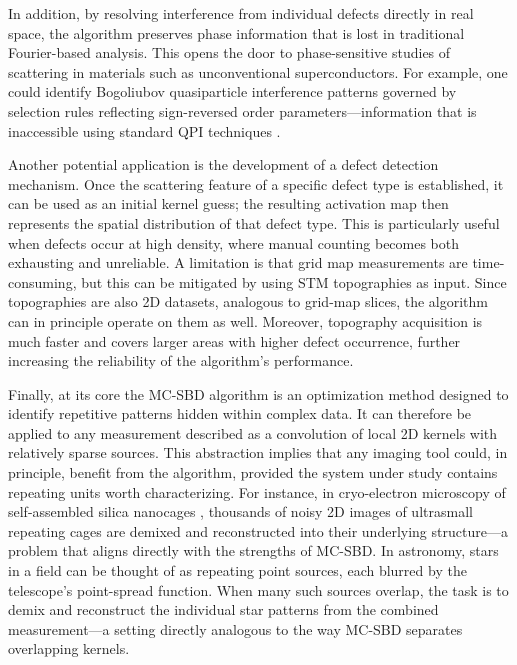 In addition, by resolving interference from individual defects directly in real space, the algorithm preserves phase information that is lost in traditional Fourier-based analysis. This opens the door to phase-sensitive studies of scattering in materials such as unconventional superconductors. For example, one could identify Bogoliubov quasiparticle interference patterns governed by selection rules reflecting sign-reversed order parameters—information that is inaccessible using standard QPI techniques \cite{chiSignInversionSuperconducting2014}.

Another potential application is the development of a defect detection mechanism. Once the scattering feature of a specific defect type is established, it can be used as an initial kernel guess; the resulting activation map then represents the spatial distribution of that defect type. This is particularly useful when defects occur at high density, where manual counting becomes both exhausting and unreliable. A limitation is that grid map measurements are time-consuming, but this can be mitigated by using STM topographies as input. Since topographies are also 2D datasets, analogous to grid-map slices, the algorithm can in principle operate on them as well. Moreover, topography acquisition is much faster and covers larger areas with higher defect occurrence, further increasing the reliability of the algorithm’s performance.

Finally, at its core the MC-SBD algorithm is an optimization method designed to identify repetitive patterns hidden within complex data. It can therefore be applied to any measurement described as a convolution of local 2D kernels with relatively sparse sources. This abstraction implies that any imaging tool could, in principle, benefit from the algorithm, provided the system under study contains repeating units worth characterizing. For instance, in cryo-electron microscopy of self-assembled silica nanocages \cite{Kochovski2020}, thousands of noisy 2D images of ultrasmall repeating cages are demixed and reconstructed into their underlying structure—a problem that aligns directly with the strengths of MC-SBD. In astronomy, stars in a field can be thought of as repeating point sources, each blurred by the telescope’s point-spread function. When many such sources overlap, the task is to demix and reconstruct the individual star patterns from the combined measurement—a setting directly analogous to the way MC-SBD separates overlapping kernels.
